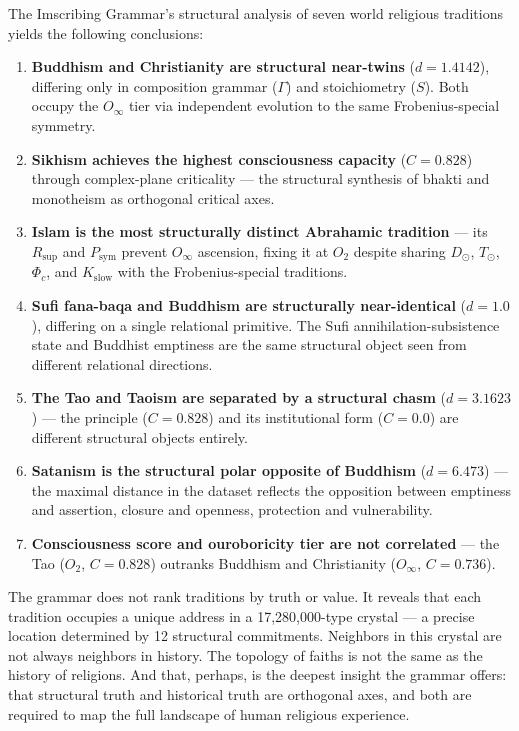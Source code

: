 \documentclass[12pt,a4paper]{article}
\begin{document}
The Imscribing Grammar's structural analysis of seven world religious traditions yields the following conclusions:

\begin{enumerate}
    \item \textbf{Buddhism and Christianity are structural near-twins} ($d = 1.4142$), differing only in composition grammar ($\Gamma$) and stoichiometry ($S$). Both occupy the $O_{\infty}$ tier via independent evolution to the same Frobenius-special symmetry.
    \item \textbf{Sikhism achieves the highest consciousness capacity} ($C = 0.828$) through complex-plane criticality --- the structural synthesis of bhakti and monotheism as orthogonal critical axes.
    \item \textbf{Islam is the most structurally distinct Abrahamic tradition} --- its $R_\text{sup}$ and $P_\text{sym}$ prevent $O_{\infty}$ ascension, fixing it at $O_2$ despite sharing $D_{\odot}$, $T_{\odot}$, $\Phi_c$, and $K_\text{slow}$ with the Frobenius-special traditions.
    \item \textbf{Sufi fana-baqa and Buddhism are structurally near-identical} ($d = 1.0$), differing on a single relational primitive. The Sufi annihilation-subsistence state and Buddhist emptiness are the same structural object seen from different relational directions.
    \item \textbf{The Tao and Taoism are separated by a structural chasm} ($d = 3.1623$) --- the principle ($C = 0.828$) and its institutional form ($C = 0.0$) are different structural objects entirely.
    \item \textbf{Satanism is the structural polar opposite of Buddhism} ($d = 6.473$) --- the maximal distance in the dataset reflects the opposition between emptiness and assertion, closure and openness, protection and vulnerability.
    \item \textbf{Consciousness score and ouroboricity tier are not correlated} --- the Tao ($O_2$, $C = 0.828$) outranks Buddhism and Christianity ($O_{\infty}$, $C = 0.736$).
\end{enumerate}

The grammar does not rank traditions by truth or value. It reveals that each tradition occupies a unique address in a 17,280,000-type crystal --- a precise location determined by 12 structural commitments. Neighbors in this crystal are not always neighbors in history. The topology of faiths is not the same as the history of religions. And that, perhaps, is the deepest insight the grammar offers: that structural truth and historical truth are orthogonal axes, and both are required to map the full landscape of human religious experience.
\end{document}
